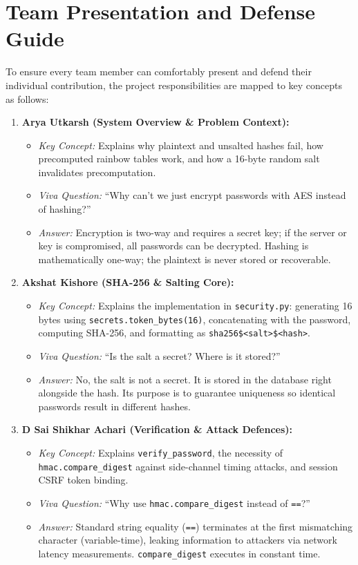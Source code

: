 \documentclass[12pt,a4paper,oneside]{report}
\begin{document}
\section{Team Presentation and Defense Guide}
\label{sec:viva_guide}
To ensure every team member can comfortably present and defend their individual contribution, the project responsibilities are mapped to key concepts as follows:

\begin{enumerate}
  \item \textbf{Arya Utkarsh (System Overview \& Problem Context):}
  \begin{itemize}
    \item \emph{Key Concept:} Explains why plaintext and unsalted hashes fail, how precomputed rainbow tables work, and how a 16-byte random salt invalidates precomputation.
    \item \emph{Viva Question:} ``Why can't we just encrypt passwords with AES instead of hashing?''
    \item \emph{Answer:} Encryption is two-way and requires a secret key; if the server or key is compromised, all passwords can be decrypted. Hashing is mathematically one-way; the plaintext is never stored or recoverable.
  \end{itemize}

  \item \textbf{Akshat Kishore (SHA-256 \& Salting Core):}
  \begin{itemize}
    \item \emph{Key Concept:} Explains the implementation in \texttt{security.py}: generating 16 bytes using \texttt{secrets.token\_bytes(16)}, concatenating with the password, computing SHA-256, and formatting as \texttt{sha256\$<salt>\$<hash>}.
    \item \emph{Viva Question:} ``Is the salt a secret? Where is it stored?''
    \item \emph{Answer:} No, the salt is not a secret. It is stored in the database right alongside the hash. Its purpose is to guarantee uniqueness so identical passwords result in different hashes.
  \end{itemize}

  \item \textbf{D Sai Shikhar Achari (Verification \& Attack Defences):}
  \begin{itemize}
    \item \emph{Key Concept:} Explains \texttt{verify\_password}, the necessity of \texttt{hmac.compare\_digest} against side-channel timing attacks, and session CSRF token binding.
    \item \emph{Viva Question:} ``Why use \texttt{hmac.compare\_digest} instead of \texttt{==}?''
    \item \emph{Answer:} Standard string equality (\texttt{==}) terminates at the first mismatching character (variable-time), leaking information to attackers via network latency measurements. \texttt{compare\_digest} executes in constant time.
  \end{itemize}


\end{enumerate}
\end{document}
